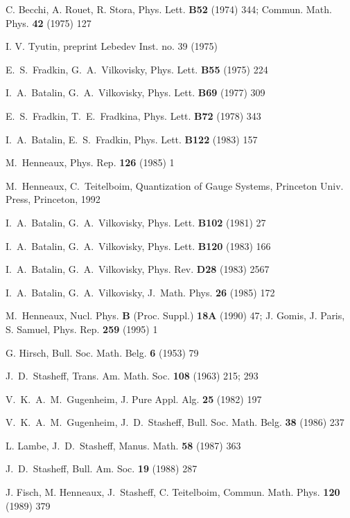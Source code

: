 \documentclass[a4paper,12pt]{article}
\begin{document}
\begin{thebibliography}{99}
  C. Becchi, A. Rouet, R. Stora, Phys. Lett. \textbf{B52} (1974)
344; Commun. Math. Phys. \textbf{42} (1975) 127

  I. V. Tyutin, preprint Lebedev Inst. no. 39 (1975)

  E.\ S.\ Fradkin, G.\ A.\ Vilkovisky, Phys. Lett. \textbf{B55}
(1975) 224

  I.\ A.\ Batalin, G.\ A.\ Vilkovisky, Phys. Lett. \textbf{B69}
(1977) 309

  E.\ S.\ Fradkin, T.\ E.\ Fradkina, Phys. Lett. \textbf{B72}
(1978) 343

  I.\ A.\ Batalin, E.\ S.\ Fradkin, Phys. Lett. \textbf{B122}
(1983) 157

  M.\ Henneaux, Phys. Rep. \textbf{126} (1985) 1

  M.\ Henneaux, C.\ Teitelboim, Quantization of Gauge Systems,
Princeton Univ. Press, Princeton, 1992

  I.\ A.\ Batalin, G.\ A.\ Vilkovisky, Phys. Lett. \textbf{B102}
(1981) 27

  I.\ A.\ Batalin, G.\ A.\ Vilkovisky, Phys. Lett. \textbf{B120}
(1983) 166

  I.\ A.\ Batalin, G.\ A.\ Vilkovisky, Phys. Rev. \textbf{D28}
(1983) 2567

  I.\ A.\ Batalin, G.\ A.\ Vilkovisky, J.\ Math. Phys. \textbf{26%
} (1985) 172

  M.\ Henneaux, Nucl. Phys. \textbf{B} (Proc. Suppl.) \textbf{18A%
} (1990) 47; J. Gomis, J. Paris, S. Samuel, Phys. Rep. \textbf{259} (1995) 1

  G. Hirsch, Bull. Soc. Math. Belg. \textbf{6} (1953) 79

  J.\ D.\ Stasheff, Trans. Am. Math. Soc. \textbf{108} (1963)
215; 293

  V.\ K.\ A.\ M.\ Gugenheim, J. Pure Appl. Alg. \textbf{25}
(1982) 197

  V.\ K.\ A.\ M.\ Gugenheim, J.\ D.\ Stasheff, Bull. Soc. Math.
Belg. \textbf{38} (1986) 237

  L. Lambe, J.\ D.\ Stasheff, Manus. Math. \textbf{58} (1987) 363

  J.\ D.\ Stasheff, Bull. Am. Soc. \textbf{19} (1988) 287

  J. Fisch, M. Henneaux, J.\ Stasheff, C. Teitelboim, Commun.
Math. Phys. \textbf{120} (1989) 379


\end{thebibliography}
\end{document}
